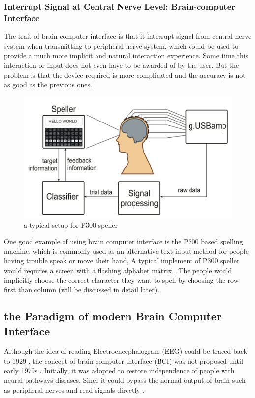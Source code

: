 \documentclass[a4paper]{article}
\begin{document}
\subsubsection{Interrupt Signal at Central Nerve Level: Brain-computer Interface}

The trait of brain-computer interface is that it interrupt signal from central nerve system when transmitting to peripheral nerve system, which could be used to provide a much more implicit and natural interaction experience. Some time this interaction or input does not even have to be awarded of by the user. But the problem is that the device required is more complicated and the accuracy is not as good as the previous ones.

\begin{figure}
	\centering
	\includegraphics[width= 0.8 \linewidth]{P300Dia}
	\caption{a typical setup for P300 speller}
	\label{fig:300Spell}
\end{figure}


One good example of using brain computer interface is the P300 based spelling machine, which is commonly used as an alternative text input method for people having trouble speak or move their hand, A typical implement of P300 speller\autocite{krusienski2008toward} would requires a screen with a flashing alphabet matrix \autocite{sakai2012alphabet}. The people would implicitly choose the correct character they want to spell by choosing the row first than column (will be discussed in detail later).

\subsection{the Paradigm of modern Brain Computer Interface}

Although the idea of reading Electroencephalogram (EEG) could be traced back to 1929 \autocite{RN46}, the concept of brain-computer interface (BCI) was not proposed until early 1970s \autocite{RN48}. Initially, it was adopted to restore independence of people with neural pathways diseases. Since it could bypass the normal output of brain such as peripheral nerves and read signals directly \autocite{RN37}.
\end{document}
